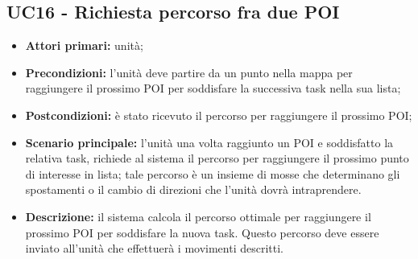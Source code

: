 \subsection{UC16 - Richiesta percorso fra due POI}
\begin{itemize}
	\item 	\textbf{Attori primari:} unità;
	\item 	\textbf{Precondizioni:} l'unità deve partire da un punto nella mappa per raggiungere il prossimo POI per soddisfare la successiva task nella sua lista;
	\item 	\textbf{Postcondizioni:} è stato ricevuto il percorso per raggiungere il prossimo POI;
	\item 	\textbf{Scenario principale:} l'unità una volta raggiunto un POI e soddisfatto la relativa task, richiede al sistema il percorso per raggiungere il prossimo punto di interesse in lista; tale percorso è un insieme di mosse che determinano gli spostamenti o il cambio di direzioni che l'unità dovrà intraprendere.
	\item 	\textbf{Descrizione:} il sistema calcola il percorso ottimale per raggiungere il prossimo POI per soddisfare la nuova task. Questo percorso deve essere inviato all'unità che effettuerà i movimenti descritti.
	
\end{itemize}
